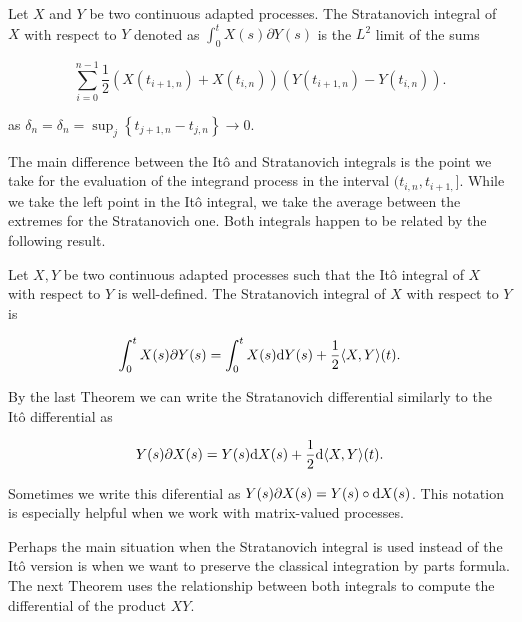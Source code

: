 \begin{definition}
    Let $X$ and $Y$ be two continuous adapted processes. The Stratanovich integral of $X$ with respect to $Y$ denoted as $\int_0^t X(s) \partial Y(s)$ is the $L^2$ limit of the sums

    \begin{equation*}
        \sum_{i=0}^{n-1} \frac12( X(t_{i+1,n}) + X(t_{i,n}))( Y(t_{i+1,n}) - Y(t_{i,n})).
    \end{equation*}

    \noindent as $\delta_n = \delta_n = \sup_j \left\{ t_{j+1,n} - t_{j,n} \right\} \to 0$.
\end{definition}

    The main difference between the Itô and Stratanovich integrals is the point we take for the evaluation of the integrand process in the interval $(t_{i,n},t_{i+1,}]$. While we take the left point in the Itô integral, we take the average between the extremes for the Stratanovich one. Both integrals happen to be related by the following result.

\begin{theorem}
    Let $X,Y$ be two continuous adapted processes such that the Itô integral of $X$ with respect to $Y$ is well-defined. The Stratanovich integral of $X$ with respect to $Y$ is 

    \begin{equation*}
        \int_0^t X(s) \partial Y(s) = \int_0^t X(s) \mathrm d Y (s) + \frac12 \langle X,Y\rangle (t).
    \end{equation*}
\end{theorem}

By the last Theorem we can write the Stratanovich differential similarly to the Itô differential as

\begin{equation*}
    Y(s) \partial X(s) = Y(s) \mathrm d X(s) + \frac12 \mathrm d \langle X,Y \rangle (t).
\end{equation*}

Sometimes we write this diferential as $Y(s) \partial X(s) = Y(s) \circ \mathrm d X(s)$. This notation is especially helpful when we work with matrix-valued processes.

Perhaps the main situation when the Stratanovich integral is used instead of the Itô version is when we want to preserve the classical integration by parts formula. The next Theorem uses the relationship between both integrals to compute the differential of the product $XY$.

